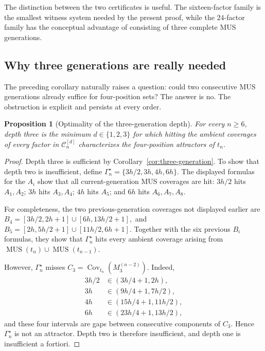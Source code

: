 \documentclass[10pt,a4paper]{article}
\newtheorem{proposition}[theorem]{Proposition}
\theoremstyle{definition}\newtheorem{definition}[theorem]{Definition}
\theoremstyle{remark}\newtheorem{remark}[theorem]{Remark}
\newcommand{\Cov}{\operatorname{Cov}}
\newcommand{\MUS}{\operatorname{MUS}}
\begin{document}
The distinction between the two certificates is useful.  The sixteen-factor family is the smallest witness system needed by the present proof, while the $24$-factor family has the conceptual advantage of consisting of three complete MUS generations.

\subsection{Why three generations are really needed}
\label{subsec:depth-optimality}

The preceding corollary naturally raises a question: could two consecutive MUS generations already suffice for four-position sets?  The answer is no.  The obstruction is explicit and persists at every order.

\begin{proposition}[Optimality of the three-generation depth]
\label{prop:depth-optimality}
For every $n\ge6$, depth three is the minimum $d\in\{1,2,3\}$ for which hitting the ambient coverages of every factor in $\mathcal C_n^{[d]}$ characterizes the four-position attractors of $t_n$.
\end{proposition}

\begin{proof}
Depth three is sufficient by Corollary~\ref{cor:three-generation}.  To show that depth two is insufficient, define
$
 \Gamma_n^\star=\{3h/2,3h,4h,6h\}.
$
The displayed formulas for the $A_i$ show that all current-generation MUS coverages are hit: $3h/2$ hits $A_1,A_2$; $3h$ hits $A_3,A_4$; $4h$ hits $A_5$; and $6h$ hits $A_6,A_7,A_8$.

For completeness, the two previous-generation coverages not displayed earlier are
$
 B_4=[3h/2,2h+1]\cup[6h,13h/2+1],
$
and
$
 B_5=[2h,5h/2+1]\cup[11h/2,6h+1].
$
Together with the six previous $B_i$ formulas, they show that $\Gamma_n^\star$ hits every ambient coverage arising from $\MUS(t_n)\cup\MUS(t_{n-1})$.

However, $\Gamma_n^\star$ misses $C_3=\Cov_{t_n}(M_3^{(n-2)})$.  Indeed,
\begin{align*}
3h/2&\in(3h/4+1,2h),\\
3h&\in(9h/4+1,7h/2),\\
4h&\in(15h/4+1,11h/2),\\
6h&\in(23h/4+1,13h/2),
\end{align*}
and these four intervals are gaps between consecutive components of $C_3$.  Hence $\Gamma_n^\star$ is not an attractor.  Depth two is therefore insufficient, and depth one is insufficient a fortiori.
\end{proof}
\end{document}
